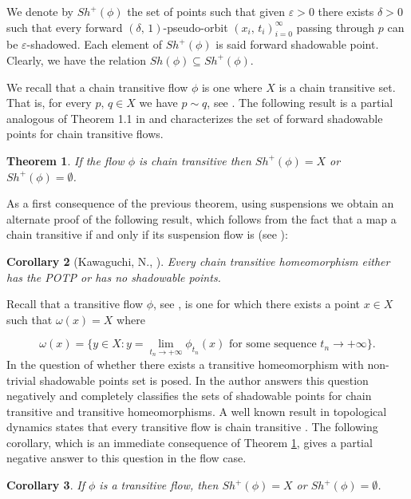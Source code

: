 \documentclass{amsart}
\newtheorem{theorem}{Theorem}[section]
\newtheorem{corollary}[theorem]{Corollary}
\theoremstyle{definition}
\newcommand{\ep}{\varepsilon}
\begin{document}
We denote by $Sh^+(\phi)$ the set of points such that given $\ep > 0$ there exists $\delta > 0$ such that every forward $(\delta,\,1)$-pseudo-orbit $(x_i,\,t_i)_{i=0}^\infty$ passing through $p$ can be $\ep$-shadowed. Each element of $Sh^+(\phi)$ is said forward shadowable point. Clearly, we have the relation $Sh(\phi) \subseteq Sh^+(\phi)$.

We recall that a chain transitive flow $\phi$ is one where $X$ is a chain transitive set. That is, for every $p,\,q\in X$ we have $p\sim q$, see \cite{Alongi07}. The following result  is a partial analogous of Theorem 1.1 in \cite{Kawaguchi17}  and characterizes the set of forward shadowable points for chain transitive flows.


\begin{theorem}\label{teo2.9}
If the flow $\phi$ is chain transitive then $Sh^+(\phi)= X$ or $Sh^+(\phi) = \emptyset$.
\end{theorem}

As a first consequence of the previous theorem, using suspensions we obtain an alternate proof of the following result, which follows from the fact that a map a chain transitive if and only if its suspension flow is (see \cite{Alongi07}): 

\begin{corollary}[Kawaguchi, N., \cite{Kawaguchi17}]
Every chain transitive homeomorphism either has the POTP or has no shadowable points.
\end{corollary} 

Recall that a transitive flow $\phi$, see \cite{CC}, is one for which there exists a point $x\in X$ such that $\omega(x) = X$
where 

\[\omega(x) = \{y\in X\colon y = \lim_{t_n\to+\infty}\phi_{t_n}(x)\mbox{ for some sequence } t_n \to +\infty\}.\]
In \cite{Morales16} the question of whether there exists a transitive homeomorphism with  non-trivial shadowable points set is posed. In \cite{Kawaguchi17} the author answers this question negatively and completely classifies the sets of shadowable points for chain transitive and transitive homeomorphisms. A well known result in topological dynamics states that every transitive flow is chain transitive \cite{Alongi07}.  The following corollary, which is an immediate consequence of Theorem \ref{teo2.9},  gives a partial negative answer to this question  in the flow case.

\begin{corollary}\label{coro4}
If $\phi$ is a transitive flow, then $Sh^+(\phi) = X$ or $Sh^+(\phi) = \emptyset$.
\end{corollary}
\end{document}
